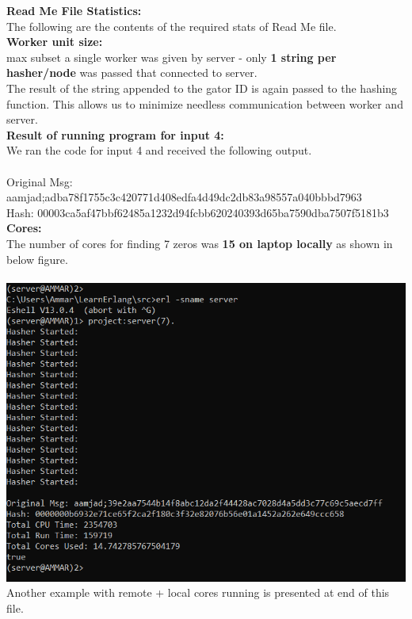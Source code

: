 \documentclass[11pt, pdftex]{article}
\begin{document}
	\textbf{Read Me File Statistics:} \\
	The following are the contents of the required stats of Read Me file.\\
	
	\textbf{Worker unit size:} \\
	max subset a single worker was given by server - only \textbf{1 string per hasher/node} was passed that connected to server.  \\
	The result of the string appended to the gator ID is again passed to the hashing function. This allows us to minimize needless communication between worker and server.  \\
	
	
	\textbf{Result of running program for input 4:} \\
	We ran the code for input 4 and received the following output. \\ \\
	Original Msg: aamjad;adba78f1755c3c420771d408edfa4d49dc2db83a98557a040bbbd7963 \\
	Hash: 00003ca5af47bbf62485a1232d94fcbb620240393d65ba7590dba7507f5181b3 \\
	
	\textbf{Cores:} \\
	The number of cores for finding 7 zeros was \textbf{15 on laptop locally} as shown in below figure. \\ \\
	\includegraphics{Picture1.png} \\
	
	
	Another example with remote + local cores running is presented at end of this file. \\
	
\end{document}
